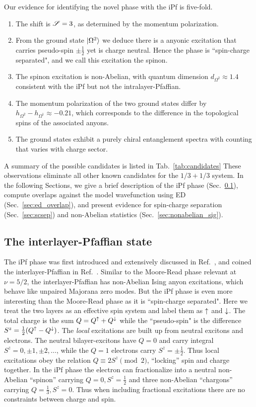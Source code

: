 Our evidence for identifying the novel phase with the iPf is five-fold.

\begin{enumerate}
\setlength\parskip{0mm}
\setlength\parsep{0mm}
\setlength\itemsep{2mm}
	\item	The shift  is $\mathscr{S}=3$, as determined by the momentum polarization.
	\item	From the ground state $ \ket{\Omega^2}$ we deduce there is a anyonic excitation that carries pseudo-spin $\pm\frac12$ yet is charge neutral. Hence the phase is ``spin-charge separated", and we call this excitation the spinon.
	\item	The spinon excitation is  non-Abelian, with quantum dimension $d_{\Omega^2} \approx 1.4$ consistent with the iPf but not the intralayer-Pfaffian.
	\item	The momentum polarization of the two ground states differ by $h_{\Omega^2} - h_{\Omega^1} \approx -0.21$, which corresponds to the difference in the topological spins of the associated anyons.
	\item	The ground states exhibit a purely chiral entanglement spectra with counting that varies with charge sector.
\end{enumerate}
A summary of the possible candidates is listed in Tab.~\ref{tab:candidates}
These observations eliminate all other known candidates for the $1/3+1/3$ system.
In the following Sections, we give a brief description of the iPf phase (Sec.~\ref{sec:iPf}), compute overlaps against the model wavefunction using ED (Sec.~\ref{sec:ed_overlap}), and present evidence
for  spin-charge separation (Sec.~\ref{sec:scsep}) 
and  non-Abelian statistics (Sec.~\ref{sec:nonabelian_sig}).



\subsection{The interlayer-Pfaffian state}\label{sec:iPf}
The iPf phase was first introduced and extensively discussed in Ref.~\cite{Ardonne02}, and coined the interlayer-Pfaffian in Ref.~\cite{Barkeshli10}.
Similar to the Moore-Read phase relevant at $\nu = 5/2$, the interlayer-Pfaffian has non-Abelian Ising anyon excitations, which behave like unpaired Majorana zero modes.
But the iPf phase is even more interesting than the Moore-Read phase as it is ``spin-charge separated".
Here we treat the two layers as an effective spin system and label them as $\uparrow$ and $\downarrow$.
The total charge is the sum $Q = Q^\uparrow + Q^\downarrow$ while the ``pseudo-spin" is the difference $S^z = \frac{1}{2} (Q^\uparrow -  Q^\downarrow)$. 
The \emph{local} excitations are built up from neutral excitons and electrons.
The neutral bilayer-excitons  have $Q=0$ and carry integral $S^z =  0, \pm 1, \pm 2, \dots$, while the $Q = 1$ electrons carry $S^z = \pm \frac{1}{2}$. 
Thus local excitations obey the relation $Q \equiv 2S^z \pmod2$, ``locking'' spin and charge together.
In the iPf phase the electron can fractionalize into a neutral non-Abelian ``spinon'' carrying $Q = 0, S^z = \frac{1}{2}$ and three non-Abelian ``chargons'' carrying $Q = \frac{1}{3}, S^z = 0$.
Thus when including fractional excitations there are no constraints between charge and spin.

